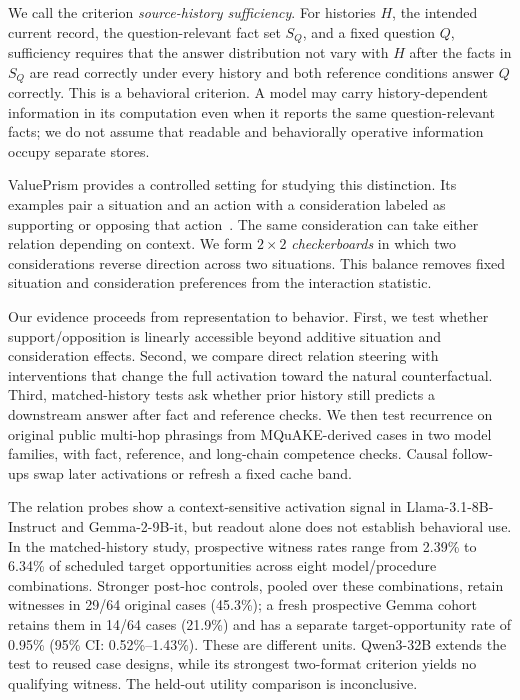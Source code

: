\documentclass{article}
\begin{document}
We call the criterion \emph{source-history sufficiency}. For histories $H$, the intended current record, the question-relevant fact set $S_Q$, and a fixed question $Q$, sufficiency requires that the answer distribution not vary with $H$ after the facts in $S_Q$ are read correctly under every history and both reference conditions answer $Q$ correctly. This is a behavioral criterion. A model may carry history-dependent information in its computation even when it reports the same question-relevant facts; we do not assume that readable and behaviorally operative information occupy separate stores.

ValuePrism provides a controlled setting for studying this distinction. Its examples pair a situation and an action with a consideration labeled as supporting or opposing that action~\citep{sorensen2024valuekaleidoscope}. The same consideration can take either relation depending on context. We form $2\times2$ \emph{checkerboards} in which two considerations reverse direction across two situations. This balance removes fixed situation and consideration preferences from the interaction statistic.


Our evidence proceeds from representation to behavior. First, we test whether support/opposition is linearly accessible beyond additive situation and consideration effects. Second, we compare direct relation steering with interventions that change the full activation toward the natural counterfactual. Third, matched-history tests ask whether prior history still predicts a downstream answer after fact and reference checks. We then test recurrence on original public multi-hop phrasings from MQuAKE-derived cases in two model families, with fact, reference, and long-chain competence checks. Causal follow-ups swap later activations or refresh a fixed cache band.

The relation probes show a context-sensitive activation signal in Llama-3.1-8B-Instruct and Gemma-2-9B-it, but readout alone does not establish behavioral use. In the matched-history study, prospective witness rates range from 2.39\% to 6.34\% of scheduled target opportunities across eight model/procedure combinations. Stronger post-hoc controls, pooled over these combinations, retain witnesses in 29/64 original cases (45.3\%); a fresh prospective Gemma cohort retains them in 14/64 cases (21.9\%) and has a separate target-opportunity rate of 0.95\% (95\% CI: 0.52\%--1.43\%). These are different units. Qwen3-32B extends the test to reused case designs, while its strongest two-format criterion yields no qualifying witness. The held-out utility comparison is inconclusive.
\end{document}
